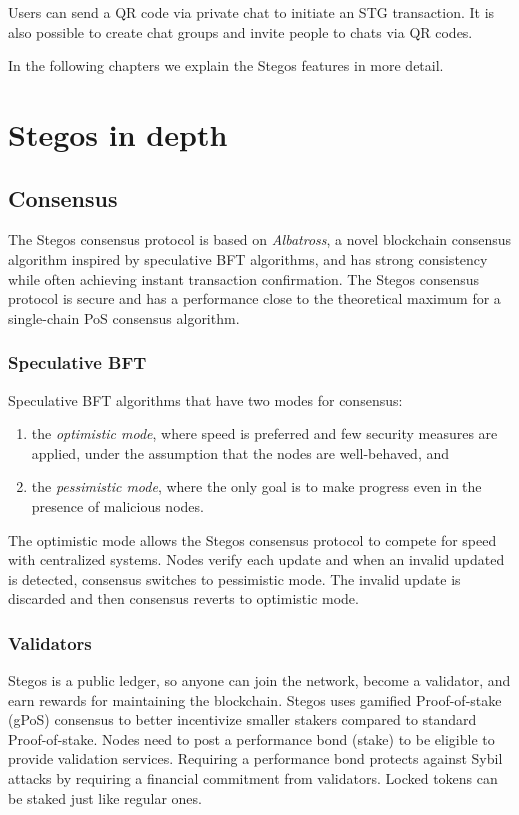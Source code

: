 \documentclass[8pt,fleqn,openany]{book}
\begin{document}
Users can send a QR code via private chat to initiate an STG transaction. It is also possible to create chat groups and invite people to chats via QR codes. 

In the following chapters we explain the Stegos features in more detail.

\chapter{Stegos in depth}\label{chap:stegos-in-depth}

\section{Consensus}
The Stegos consensus protocol is based on \textit{Albatross}\cite{c23}, a novel blockchain consensus algorithm inspired by speculative BFT\cite{c9} algorithms, and has strong consistency while often achieving instant transaction confirmation. The Stegos consensus protocol is secure and has a performance close to the theoretical maximum for a single-chain PoS consensus algorithm.

\subsection{Speculative BFT}
Speculative BFT algorithms that have two modes for consensus: 

\begin{enumerate}
	\item the \textit{optimistic mode}, where speed is preferred and few security measures are applied, under the assumption that the nodes are well-behaved, and
	\item the \textit{pessimistic mode}, where the only goal is to make progress even in the presence of malicious nodes.
\end{enumerate}

The optimistic mode allows the Stegos consensus protocol to compete for speed with centralized systems. Nodes verify each update and when an invalid updated is detected, consensus switches to pessimistic mode. The invalid update is discarded and then consensus reverts to optimistic mode.

\subsection{Validators}
Stegos is a public ledger, so anyone can join the network, become a validator, and earn rewards for maintaining the blockchain. Stegos uses gamified Proof-of-stake (gPoS) consensus to better incentivize smaller stakers compared to standard Proof-of-stake. Nodes need to post a performance bond (stake) to be eligible to provide validation services. Requiring a performance bond protects against Sybil attacks by requiring a financial commitment from validators. Locked tokens can be staked just like regular ones.
\end{document}
